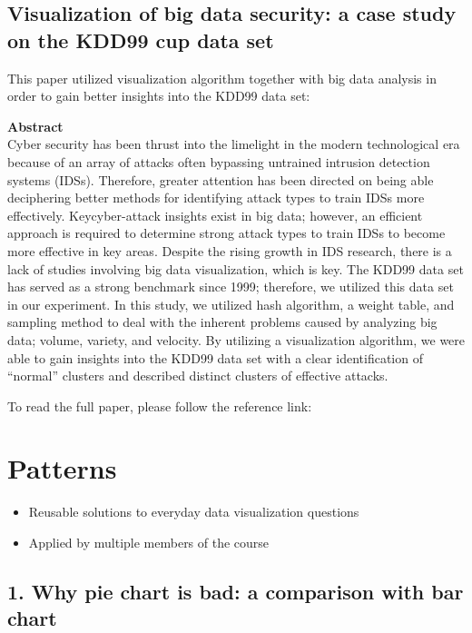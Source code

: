 \documentclass[]{book}
\providecommand{\tightlist}{%
  \setlength{\itemsep}{0pt}\setlength{\parskip}{0pt}}
\theoremstyle{definition}
\theoremstyle{definition}
\theoremstyle{definition}
\theoremstyle{remark}
\begin{document}
\section{Visualization of big data security: a case study on the KDD99
cup data
set}\label{visualization-of-big-data-security-a-case-study-on-the-kdd99-cup-data-set-1}

This paper utilized visualization algorithm together with big data
analysis in order to gain better insights into the KDD99 data set:

\textbf{Abstract}\\
Cyber security has been thrust into the limelight in the modern
technological era because of an array of attacks often bypassing
untrained intrusion detection systems (IDSs). Therefore, greater
attention has been directed on being able deciphering better methods for
identifying attack types to train IDSs more effectively. Keycyber-attack
insights exist in big data; however, an efficient approach is required
to determine strong attack types to train IDSs to become more effective
in key areas. Despite the rising growth in IDS research, there is a lack
of studies involving big data visualization, which is key. The KDD99
data set has served as a strong benchmark since 1999; therefore, we
utilized this data set in our experiment. In this study, we utilized
hash algorithm, a weight table, and sampling method to deal with the
inherent problems caused by analyzing big data; volume, variety, and
velocity. By utilizing a visualization algorithm, we were able to gain
insights into the KDD99 data set with a clear identification of
``normal'' clusters and described distinct clusters of effective
attacks.

To read the full paper, please follow the reference link: \citep{KDD99}

\chapter{Patterns}\label{patterns}

\begin{itemize}
\tightlist
\item
  Reusable solutions to everyday data visualization questions
\item
  Applied by multiple members of the course
\end{itemize}

\section{1. Why pie chart is bad: a comparison with bar
chart}\label{why-pie-chart-is-bad-a-comparison-with-bar-chart}
\end{document}
